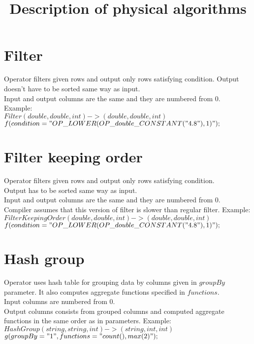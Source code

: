 \documentclass{article}
\begin{document}
\title{Description of physical algorithms}

\maketitle

\section{Filter}
Operator filters given rows and output only rows satisfying condition.
Output doesn't have to be sorted same way as input. \\
Input and output columns are the same and they are numbered from 0.\\
Example: \\
$Filter(double,double,int)->(double,double,int)$\\
$f(condition="OP\_LOWER(OP\_double\_CONSTANT("4.8"),1)"); $\\


\section{Filter keeping order}
Operator filters given rows and output only rows satisfying condition.\\
Output has to be sorted same way as input. \\
Input and output columns are the same and they are numbered from 0.\\
Compiler assumes that this version of filter is slower than regular filter.
Example: \\
$FilterKeepingOrder(double,double,int)->(double,double,int)$ \\
$f(condition="OP\_LOWER(OP\_double\_CONSTANT("4.8"),1)"); $ \\

\section{Hash group}
Operator uses hash table for grouping data by columns given in $groupBy$ parameter.
It also computes aggregate functions specified in $functions$.\\
Input columns are numbered from 0.\\
Output columns consists from grouped columns and computed aggregate functions in the same order as in parameters.
Example: \\  
$HashGroup(string,string,int)->(string,int,int)$ \\
$g(groupBy="1",functions="count(),max(2)");$ \\
\end{document}
